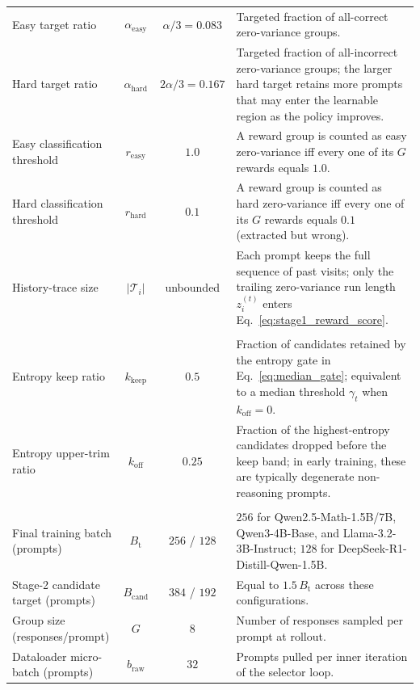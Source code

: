 \begin{table}[t]
\begin{tabular}{>{\raggedright\arraybackslash}p{3.9cm} c c >{\raggedright\arraybackslash}p{6.1cm}}
Easy target ratio                     & $\alpha_{\mathrm{easy}}$ & $\alpha/3{=}0.083$ & Targeted fraction of all-correct zero-variance groups. \\
Hard target ratio                     & $\alpha_{\mathrm{hard}}$ & $2\alpha/3{=}0.167$ & Targeted fraction of all-incorrect zero-variance groups; the larger hard target retains more prompts that may enter the learnable region as the policy improves. \\
Easy classification threshold         & $r_{\mathrm{easy}}$     & $1.0$      & A reward group is counted as easy zero-variance iff every one of its $G$ rewards equals $1.0$. \\
Hard classification threshold         & $r_{\mathrm{hard}}$     & $0.1$      & A reward group is counted as hard zero-variance iff every one of its $G$ rewards equals $0.1$ (extracted but wrong). \\
History-trace size                    & $|\mathcal{T}_i|$       & unbounded  & Each prompt keeps the full sequence of past visits; only the trailing zero-variance run length $z_i^{(t)}$ enters Eq.~\eqref{eq:stage1_reward_score}. \\
\midrule
\multicolumn{4}{l}{\textit{Stage~2: online entropy verification}} \\
\midrule
Entropy keep ratio                    & $k_{\mathrm{keep}}$     & $0.5$      & Fraction of candidates retained by the entropy gate in Eq.~\eqref{eq:median_gate}; equivalent to a median threshold $\gamma_t$ when $k_{\mathrm{off}}{=}0$. \\
Entropy upper-trim ratio              & $k_{\mathrm{off}}$      & $0.25$     & Fraction of the highest-entropy candidates dropped before the keep band; in early training, these are typically degenerate non-reasoning prompts. \\
\midrule
\multicolumn{4}{l}{\textit{Batch sizing}} \\
\midrule
Final training batch (prompts)        & $B_{\mathrm{t}}$        & $256$ / $128$ & $256$ for Qwen2.5-Math-1.5B/7B, Qwen3-4B-Base, and Llama-3.2-3B-Instruct; $128$ for DeepSeek-R1-Distill-Qwen-1.5B. \\
Stage-2 candidate target (prompts)    & $B_{\mathrm{cand}}$     & $384$ / $192$ & Equal to $1.5\,B_{\mathrm{t}}$ across these configurations. \\
Group size (responses/prompt)         & $G$                     & $8$        & Number of responses sampled per prompt at rollout. \\
Dataloader micro-batch (prompts)      & $b_{\mathrm{raw}}$      & $32$       & Prompts pulled per inner iteration of the selector loop. \\

\end{tabular}
\end{table}
